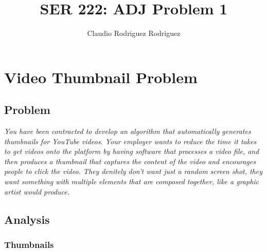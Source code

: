 \documentclass{article}
\begin{document}
\title{SER 222: ADJ Problem 1}
\author{Claudio Rodriguez Rodriguez}
\maketitle







\section{Video Thumbnail Problem}

\subsection{Problem}

\textit{You have been contracted to develop an algorithm that automatically generates thumbnails for
YouTube videos. Your employer wants to reduce the time it takes to get videos onto the platform by having
software that processes a video file, and then produces a thumbnail that captures the content of the video
and encourages people to click the video. They denitely don't want just a random screen shot, they want
something with multiple elements that are composed together, like a graphic artist would produce.}

\subsection{Analysis}

\subsubsection{Thumbnails}
\end{document}
